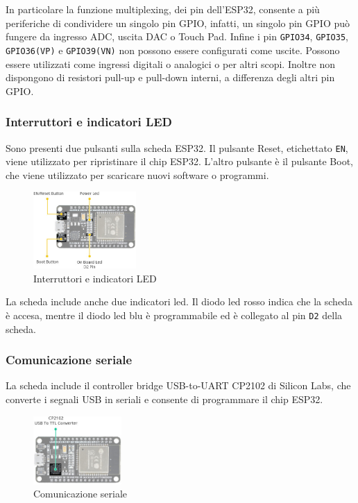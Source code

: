 \documentclass[a4paper,12pt]{report}  %
\newcommand{\lstinlinebg}[1]{\colorbox{backcolour}{\lstinline|#1|}}
\begin{document}
In particolare la funzione multiplexing, dei pin dell'ESP32, consente a più periferiche di condividere un singolo pin GPIO, infatti, un singolo pin GPIO può fungere da ingresso ADC, uscita DAC o Touch Pad.
Infine i pin \lstinlinebg{GPIO34}, \lstinlinebg{GPIO35}, \lstinlinebg{GPIO36(VP)} e \lstinlinebg{GPIO39(VN)} non possono essere conﬁgurati come uscite.
Possono essere utilizzati come ingressi digitali o analogici o per altri scopi.
Inoltre non dispongono di resistori pull-up e pull-down interni, a diﬀerenza degli altri pin GPIO.

\subsubsection{Interruttori e indicatori LED}
Sono presenti due pulsanti sulla scheda ESP32.
Il pulsante Reset, etichettato \lstinlinebg{EN}, viene utilizzato per ripristinare il chip ESP32.
L'altro pulsante è il pulsante Boot, che viene utilizzato per scaricare nuovi software o programmi.

\begin{figure}[h]
    \centering
    \includegraphics[width=0.35\textwidth]{imgs/ESP32-Hardware-Specifications-Reset-Boot-Buttons-LED-Indicators.jpg}
    \caption{Interruttori e indicatori LED}
    \label{fig:ESP32-LED}
\end{figure}

La scheda include anche due indicatori led. Il diodo led rosso indica che la scheda è accesa, mentre il diodo led blu è programmabile ed è collegato al pin \lstinlinebg{D2} della scheda.

\subsubsection{Comunicazione seriale}
La scheda include il controller bridge USB-to-UART CP2102 di Silicon Labs, che converte i segnali USB in seriali e consente di programmare il chip ESP32.

\begin{figure}[h]
    \centering
    \includegraphics[width=0.3\textwidth]{imgs/ESP32-Hardware-Specifications-USB-to-TTL-Converter.jpg}
    \caption{Comunicazione seriale}
    \label{fig:ESP32-serial}
\end{figure}
\end{document}
